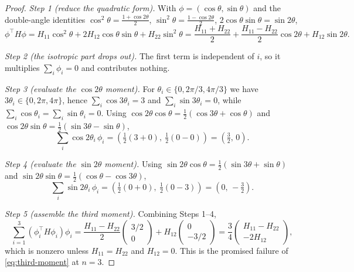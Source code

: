 \documentclass[11pt,a4paper]{article}
\theoremstyle{plain}
\theoremstyle{definition}
\begin{document}
\begin{proof}
\emph{Step 1 (reduce the quadratic form).} With $\phi=(\cos\theta,\sin\theta)$ and the
double-angle identities $\cos^2\theta=\frac{1+\cos2\theta}{2}$,
$\sin^2\theta=\frac{1-\cos2\theta}{2}$, $2\cos\theta\sin\theta=\sin2\theta$,
\begin{equation*}
    \phi^{\top}H\phi
    =H_{11}\cos^2\theta+2H_{12}\cos\theta\sin\theta+H_{22}\sin^2\theta
    =\frac{H_{11}+H_{22}}{2}
    +\frac{H_{11}-H_{22}}{2}\cos2\theta
    +H_{12}\sin2\theta .
\end{equation*}

\emph{Step 2 (the isotropic part drops out).} The first term is independent of $i$, so it
multiplies $\sum_i\phi_i=0$ and contributes nothing.

\emph{Step 3 (evaluate the $\cos2\theta$ moment).} For $\theta_i\in\{0,2\pi/3,4\pi/3\}$ we have
$3\theta_i\in\{0,2\pi,4\pi\}$, hence $\sum_i\cos3\theta_i=3$ and $\sum_i\sin3\theta_i=0$, while
$\sum_i\cos\theta_i=\sum_i\sin\theta_i=0$. Using
$\cos2\theta\cos\theta=\frac12(\cos3\theta+\cos\theta)$ and
$\cos2\theta\sin\theta=\frac12(\sin3\theta-\sin\theta)$,
\begin{equation*}
    \sum_i\cos2\theta_i\,\phi_i
    =\left(\tfrac12(3+0),\ \tfrac12(0-0)\right)
    =\left(\tfrac32,\,0\right).
\end{equation*}

\emph{Step 4 (evaluate the $\sin2\theta$ moment).} Using
$\sin2\theta\cos\theta=\frac12(\sin3\theta+\sin\theta)$ and
$\sin2\theta\sin\theta=\frac12(\cos\theta-\cos3\theta)$,
\begin{equation*}
    \sum_i\sin2\theta_i\,\phi_i
    =\left(\tfrac12(0+0),\ \tfrac12(0-3)\right)
    =\left(0,\,-\tfrac32\right).
\end{equation*}

\emph{Step 5 (assemble the third moment).} Combining Steps 1--4,
\begin{equation}\label{eq:n3-third-moment}
    \sum_{i=1}^3\left(\phi_i^{\top}H\phi_i\right)\phi_i
    =\frac{H_{11}-H_{22}}{2}\begin{pmatrix}3/2\\0\end{pmatrix}
    +H_{12}\begin{pmatrix}0\\-3/2\end{pmatrix}
    =\frac34\begin{pmatrix}H_{11}-H_{22}\\-2H_{12}\end{pmatrix},
\end{equation}
which is nonzero unless $H_{11}=H_{22}$ and $H_{12}=0$. This is the promised failure of
\eqref{eq:third-moment} at $n=3$.


\end{proof}
\end{document}
